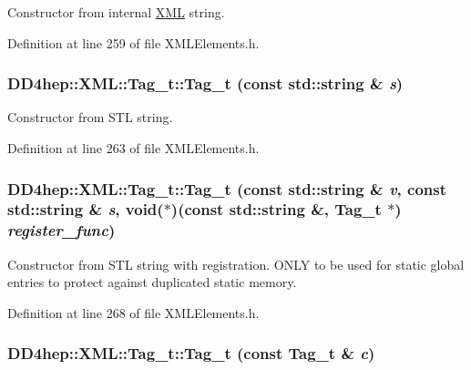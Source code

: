 Constructor from internal \hyperlink{namespace_d_d4hep_1_1_x_m_l}{XML} string. 

Definition at line 259 of file XMLElements.h.\hypertarget{class_d_d4hep_1_1_x_m_l_1_1_tag__t_a1b57625b6abcc2e563bf55b5e69f5877}{
\subsubsection[{Tag\_\-t}]{\setlength{\rightskip}{0pt plus 5cm}DD4hep::XML::Tag\_\-t::Tag\_\-t (const std::string \& {\em s})}}
\label{class_d_d4hep_1_1_x_m_l_1_1_tag__t_a1b57625b6abcc2e563bf55b5e69f5877}


Constructor from STL string. 

Definition at line 263 of file XMLElements.h.\hypertarget{class_d_d4hep_1_1_x_m_l_1_1_tag__t_a852d3feade27fadfa267798e8e417b80}{
\subsubsection[{Tag\_\-t}]{\setlength{\rightskip}{0pt plus 5cm}DD4hep::XML::Tag\_\-t::Tag\_\-t (const std::string \& {\em v}, \/  const std::string \& {\em s}, \/  void($\ast$)(const std::string \&, {\bf Tag\_\-t} $\ast$) {\em register\_\-func})}}
\label{class_d_d4hep_1_1_x_m_l_1_1_tag__t_a852d3feade27fadfa267798e8e417b80}
Constructor from STL string with registration. ONLY to be used for static global entries to protect against duplicated static memory. 

Definition at line 268 of file XMLElements.h.\hypertarget{class_d_d4hep_1_1_x_m_l_1_1_tag__t_a098fcb4e75ad5b52a8f02e10e5672ad9}{
\subsubsection[{Tag\_\-t}]{\setlength{\rightskip}{0pt plus 5cm}DD4hep::XML::Tag\_\-t::Tag\_\-t (const {\bf Tag\_\-t} \& {\em c})}}
\label{class_d_d4hep_1_1_x_m_l_1_1_tag__t_a098fcb4e75ad5b52a8f02e10e5672ad9}


